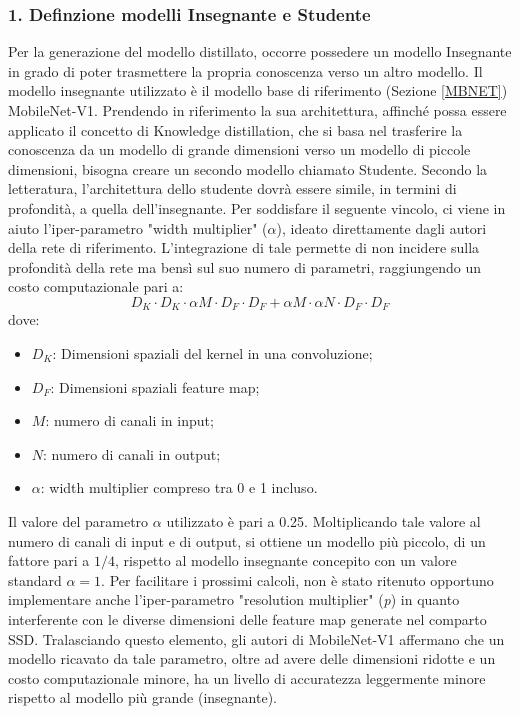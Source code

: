 \subsubsection{1. Definzione modelli Insegnante e Studente}
Per la generazione del modello distillato, occorre possedere un modello Insegnante in grado di poter trasmettere la propria conoscenza verso un altro modello. Il modello insegnante utilizzato è il modello base di riferimento (Sezione \ref{MBNET}) MobileNet-V1. Prendendo in riferimento la sua architettura, affinché possa essere applicato il concetto di Knowledge distillation, che si basa nel trasferire la conoscenza da un modello di grande dimensioni verso un modello di piccole dimensioni, bisogna creare un secondo modello chiamato Studente. Secondo la letteratura, l'architettura dello studente dovrà essere simile, in termini di profondità, a quella dell'insegnante. Per soddisfare il seguente vincolo,  ci viene in aiuto l'iper-parametro "width multiplier" ($\alpha$), ideato direttamente dagli autori della rete di riferimento. L'integrazione di tale permette di non incidere sulla profondità della rete ma bensì sul suo numero di parametri, raggiungendo un costo computazionale pari a:
\begin{equation}
    D_K \cdot D_K \cdot \alpha M \cdot D_F \cdot D_F + \alpha M \cdot \alpha N \cdot D_F \cdot D_F
\end{equation}
dove:
\begin{itemize}
    \item $D_K$: Dimensioni spaziali del kernel in una convoluzione;
    \item $D_F$: Dimensioni spaziali feature map;
    \item $M$: numero di canali in input;
    \item $N$: numero di canali in output;
    \item $\alpha$: width multiplier compreso tra 0 e 1 incluso.
\end{itemize}
Il valore del parametro $\alpha$ utilizzato è pari a 0.25. Moltiplicando tale valore al numero di canali di input e di output, si ottiene un modello più piccolo, di un fattore pari a $1/4$, rispetto al modello insegnante concepito con un valore standard $\alpha=1$. Per facilitare i prossimi calcoli, non è stato ritenuto opportuno implementare anche l'iper-parametro "resolution multiplier" (\emph{p}) in quanto interferente con le diverse dimensioni delle feature map generate nel comparto SSD. Tralasciando questo elemento, gli autori di MobileNet-V1 affermano che un modello ricavato da tale parametro, oltre ad avere delle dimensioni ridotte e un costo computazionale minore, ha un livello di accuratezza leggermente minore rispetto al modello più grande (insegnante). 

